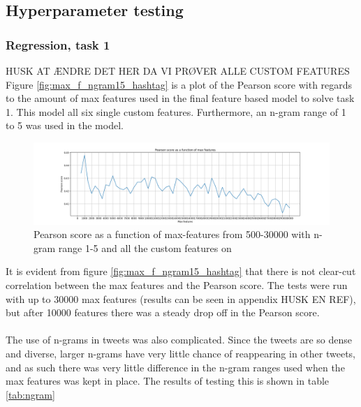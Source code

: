\subsection{Hyperparameter testing}
\subsubsection{Regression, task 1}
HUSK AT ÆNDRE DET HER DA VI PRØVER ALLE CUSTOM FEATURES\\
Figure \ref{fig:max_f_ngram15_hashtag} is a plot of the Pearson score with regards to the amount of max features used in the final feature based model to solve task 1. This model all six single custom features. Furthermore, an n-gram range of 1 to 5 was used in the model.
\begin{figure}[H]
    \centering
        \includegraphics[width=\textwidth]{pictures/max_f_pearson.png}
        \caption{Pearson score as a function of max-features from 500-30000 with n-gram range 1-5 and all the custom features on}
        \label{fig:max_f_pearson}
\end{figure}
It is evident from figure \ref{fig:max_f_ngram15_hashtag} that there is not clear-cut correlation between the max features and the Pearson score. The tests were run with up to 30000 max features (results can be seen in appendix HUSK EN REF), but after 10000 features there was a steady drop off in the Pearson score.\\
\\
The use of n-grams in tweets was also complicated. Since the tweets are so dense and diverse, larger n-grams have very little chance of reappearing in other tweets, and as such there was very little difference in the n-gram ranges used when the max features was kept in place. The results of testing this is shown in table \ref{tab:ngram}\\

